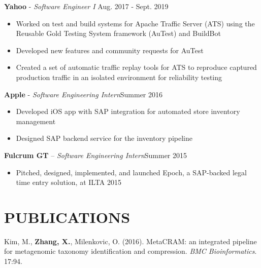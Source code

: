 \documentclass[resmargin]{res}
\begin{document}
\begin{resume}
	{\bf Yahoo} - {\sl Software Engineer I} \hfill Aug. 2017 - Sept. 2019	
	\begin{itemize}
		\vspace{1mm}
		\item Worked on test and build systems for Apache Traffic Server (ATS) using the Reusable Gold Testing System framework (AuTest) and BuildBot
		\item Developed new features and community requests for AuTest
		\item Created a set of automatic traffic replay tools for ATS to reproduce captured production traffic in an isolated environment for reliability testing
	\end{itemize}
	
	{\bf Apple} - {\sl Software Engineering Intern}\hfill Summer 2016
	\begin{itemize}
		\vspace{1mm}
		\item Developed iOS app with SAP integration for automated store inventory management
		\item Designed SAP backend service for the inventory pipeline
	\end{itemize}
	
	{\bf Fulcrum GT} -- {\sl Software Engineering Intern}\hfill Summer 2015
	\begin{itemize}
		\vspace{1mm}
		\item Pitched, designed, implemented, and launched Epoch, a SAP-backed legal time entry solution, at ILTA 2015
	\end{itemize}

\section{PUBLICATIONS}
	\textnormal{Kim, M., \textbf{Zhang, X.}, Milenkovic, O. (2016). MetaCRAM: an integrated pipeline for metagenomic taxonomy identification and compression. \textit{BMC Bioinformatics}. 17:94.}


\end{resume}
\end{document}
